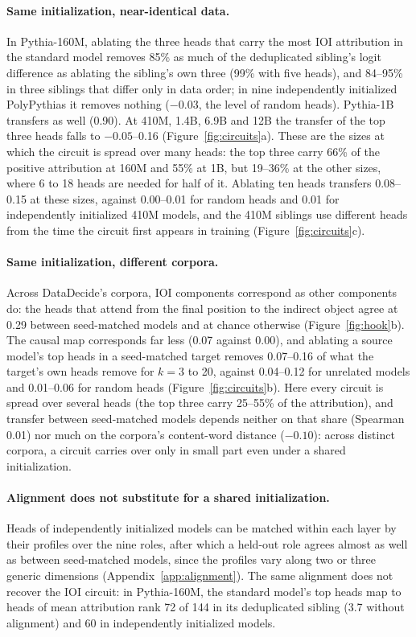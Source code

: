 \documentclass[11pt]{article}
\begin{document}
\paragraph{Same initialization, near-identical data.}
In Pythia-160M, ablating the three heads that carry the most IOI attribution in the standard model removes 85\% as much of the deduplicated sibling's logit difference as ablating the sibling's own three (99\% with five heads), and 84--95\% in three siblings that differ only in data order; in nine independently initialized PolyPythias it removes nothing ($-0.03$, the level of random heads).
Pythia-1B transfers as well (0.90).
At 410M, 1.4B, 6.9B and 12B the transfer of the top three heads falls to $-0.05$--0.16 (Figure~\ref{fig:circuits}a).
These are the sizes at which the circuit is spread over many heads: the top three carry 66\% of the positive attribution at 160M and 55\% at 1B, but 19--36\% at the other sizes, where 6 to 18 heads are needed for half of it.
Ablating ten heads transfers 0.08--0.15 at these sizes, against 0.00--0.01 for random heads and 0.01 for independently initialized 410M models, and the 410M siblings use different heads from the time the circuit first appears in training (Figure~\ref{fig:circuits}c).

\paragraph{Same initialization, different corpora.}
Across DataDecide's corpora, IOI components correspond as other components do: the heads that attend from the final position to the indirect object agree at 0.29 between seed-matched models and at chance otherwise (Figure~\ref{fig:hook}b).
The causal map corresponds far less (0.07 against 0.00), and ablating a source model's top heads in a seed-matched target removes 0.07--0.16 of what the target's own heads remove for $k = 3$ to 20, against 0.04--0.12 for unrelated models and 0.01--0.06 for random heads (Figure~\ref{fig:circuits}b).
Here every circuit is spread over several heads (the top three carry 25--55\% of the attribution), and transfer between seed-matched models depends neither on that share (Spearman 0.01) nor much on the corpora's content-word distance ($-0.10$): across distinct corpora, a circuit carries over only in small part even under a shared initialization.

\paragraph{Alignment does not substitute for a shared initialization.}
Heads of independently initialized models can be matched within each layer by their profiles over the nine roles, after which a held-out role agrees almost as well as between seed-matched models, since the profiles vary along two or three generic dimensions (Appendix~\ref{app:alignment}).
The same alignment does not recover the IOI circuit: in Pythia-160M, the standard model's top heads map to heads of mean attribution rank 72 of 144 in its deduplicated sibling (3.7 without alignment) and 60 in independently initialized models.
\end{document}
